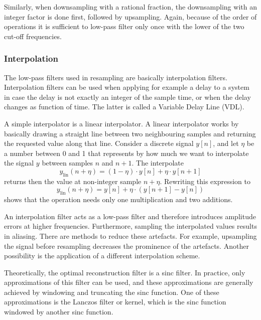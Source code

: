 Similarly, when downsampling with a rational fraction, the downsampling with an
integer factor is done first, followed by upsampling. Again, because of the
order of operations it is sufficient to low-pass filter only once with the lower
of the two cut-off frequencies.

\subsubsection{Interpolation} %
The low-pass filters used in resampling are basically interpolation filters.
Interpolation filters can be used when applying for example a delay to a system in case
the delay is not exactly an integer of the sample time, or when the delay
changes as function of time. The latter is called a Variable Delay Line (VDL).

A simple interpolator is a linear interpolator. A linear interpolator works by
basically drawing a straight line between two neighbouring samples and returning
the requested value along that line. Consider a discrete signal $y[n]$, and let
$\eta$ be a number between 0 and 1 that represents by how much we want to
interpolate the signal $y$ between samples $n$ and $n+1$. The interpolate
\begin{equation}
  y_{\mathrm{lin}} (n + \eta) = (1-\eta) \cdot y[n] + \eta \cdot y[n+1]
\end{equation}
returns then the value at non-integer sample $n+\eta$. Rewriting this expression to
\begin{equation}\label{eq:theory:signal:resampling:interpolation-linear}
  y_{\mathrm{lin}} (n + \eta) = y[n] + \eta \cdot \left( y[n+1] - y[n] \right)
\end{equation}
shows that the operation needs only one multiplication and two additions.

An interpolation filter acts as a low-pass filter and therefore introduces
amplitude errors at higher frequencies. Furthermore, sampling the interpolated
values results in aliasing. There are methods to reduce these artefacts. For
example, upsampling the signal before resampling decreases the prominence of the
artefacts. Another possibility is the application of a different interpolation scheme.

Theoretically, the optimal reconstruction filter is a sinc filter. In practice,
only approximations of this filter can be used, and these approximations are
generally achieved by windowing and truncating the sinc function. One of these
approximations is the Lanczos filter or kernel, which is the sinc function
windowed by another sinc function.

